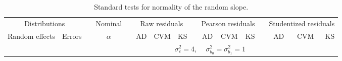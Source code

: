\begin{table}[ht]
\begin{scriptsize}
\begin{center}
\begin{tabular}{ll p{.1cm} c p{.1cm} rrr p{.1cm} rrr p{.1cm} rrr}
   \hline
\end{tabular}
\end{center}
\end{scriptsize}
\end{table}


\begin{table}[ht]
\caption{\label{tab:evalb1}Standard tests for normality of the random slope.}
\begin{scriptsize}
\begin{center}
\begin{tabular}{ll p{.1cm} c p{.1cm} rrr p{.1cm} rrr p{.1cm} rrr}
  \hline
  \multicolumn{2}{c}{Distributions}& & Nominal & &  \multicolumn{3}{c}{Raw residuals} & & \multicolumn{3}{c}{Pearson residuals} & & \multicolumn{3}{c}{Studentized residuals}\\ \cline{1-2} \cline{6-8} \cline{10-12} \cline{14-16}
  Random effects & Errors & & $\alpha$ & & AD & CVM & KS & & AD & CVM & KS & & AD & CVM & KS \\ 
   \hline
& && && \multicolumn{9}{c}{$\sigma_{\varepsilon}^2 = 4$, \ \ $\sigma_{b_0}^2 = \sigma_{b_1}^2 = 1$} \\ \cline{6-16}


\end{tabular}
\end{center}
\end{scriptsize}
\end{table}
